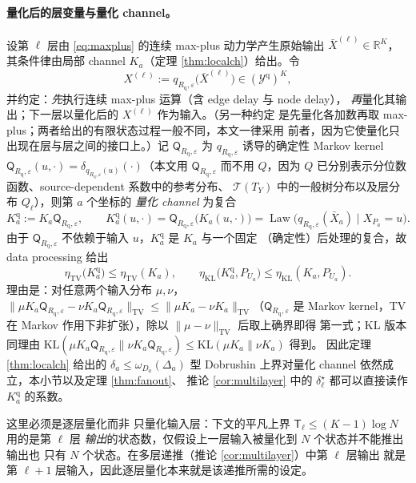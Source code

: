 \documentclass[a4paper,11pt]{article}
\theoremstyle{definition}
\newcommand{\R}{\mathbb R}
\newcommand{\1}{\mathbf 1}
\newcommand{\TV}{\mathrm{TV}}
\newcommand{\KL}{\mathrm{KL}}
\newcommand{\Law}{\operatorname{Law}}
\newcommand{\calT}{\mathcal T}
\newcommand{\TCs}{\mathsf T}
\newcommand{\Rq}{R_{\mathrm{q}}}
\newcommand{\Qq}{\mathsf Q_{\Rq,\varepsilon}}
\begin{document}
\paragraph{量化后的层变量与量化 channel。}
设第 $\ell$ 层由 \eqref{eq:maxplus} 的连续 max-plus 动力学产生原始输出
$\bar X^{(\ell)}\in\R^{K}$，其条件律由局部 channel $K_a$（定理
\ref{thm:localch}）给出。令
\begin{equation}
\label{eq:qlayer}
X^{(\ell)}:=q_{\Rq,\varepsilon}\bigl(\bar X^{(\ell)}\bigr)
\in(\mathcal Y^{\mathrm{q}})^{K},
\end{equation}
并约定：\emph{先}执行连续 max-plus 运算（含 edge delay 与 node delay），
\emph{再}量化其输出；下一层以量化后的 $X^{(\ell)}$ 作为输入。（另一种约定
是先量化各加数再取 max-plus；两者给出的有限状态过程一般不同，本文一律采用
前者，因为它使量化只出现在层与层之间的接口上。）记 $\Qq$ 为
$q_{\Rq,\varepsilon}$ 诱导的确定性 Markov kernel
$\Qq(u,\cdot)=\delta_{q_{\Rq,\varepsilon}(u)}(\cdot)$（本文用 $\Qq$ 而不用
$Q$，因为 $Q$ 已分别表示分位数函数、source-dependent 系数中的参考分布、
$\calT(T_Y)$ 中的一般树分布以及层分布 $Q_\ell$），则第 $a$ 个坐标的
\emph{量化 channel} 为复合
\begin{equation}
\label{eq:qchannel}
K_a^{\mathrm{q}}:=K_a\Qq,
\qquad
K_a^{\mathrm{q}}(u,\cdot)=\Qq\bigl(K_a(u,\cdot)\bigr)
=\Law\bigl(q_{\Rq,\varepsilon}(\bar X_a)\mid X_{P_a}=u\bigr).
\end{equation}
由于 $\Qq$ 不依赖于输入 $u$，$K_a^{\mathrm{q}}$ 是 $K_a$ 与一个固定
（确定性）后处理的复合，故 data processing 给出
\begin{equation}
\label{eq:qdpi}
\eta_{\TV}\bigl(K_a^{\mathrm{q}}\bigr)\le\eta_{\TV}(K_a),
\qquad
\eta_{\KL}\bigl(K_a^{\mathrm{q}},P_{U_a}\bigr)\le\eta_{\KL}(K_a,P_{U_a}).
\end{equation}
理由是：对任意两个输入分布 $\mu,\nu$，
$\|\mu K_a\Qq-\nu K_a\Qq\|_{\TV}\le\|\mu K_a-\nu K_a\|_{\TV}$（$\Qq$ 是 Markov
kernel，TV 在 Markov 作用下非扩张），除以 $\|\mu-\nu\|_{\TV}$ 后取上确界即得
第一式；KL 版本同理由 $\KL(\mu K_a\Qq\|\nu K_a\Qq)\le\KL(\mu K_a\|\nu K_a)$ 得到。
因此定理 \ref{thm:localch} 给出的 $\delta_a\le\omega_{D_a}(\Delta_a)$ 型
Dobrushin 上界对量化 channel 依然成立，本小节以及定理 \ref{thm:fanout}、
推论 \ref{cor:multilayer} 中的 $\delta^\star_\ell$ 都可以直接读作
$K_a^{\mathrm{q}}$ 的系数。

这里必须是逐层量化而非
只量化输入层：下文的平凡上界 $\TCs_\ell\le(K-1)\log N$ 用的是第 $\ell$ 层
\emph{输出}的状态数，仅假设上一层输入被量化到 $N$ 个状态并不能推出输出也
只有 $N$ 个状态。在多层递推（推论 \ref{cor:multilayer}）中第 $\ell$ 层输出
就是第 $\ell+1$ 层输入，因此逐层量化本来就是该递推所需的设定。
\end{document}
